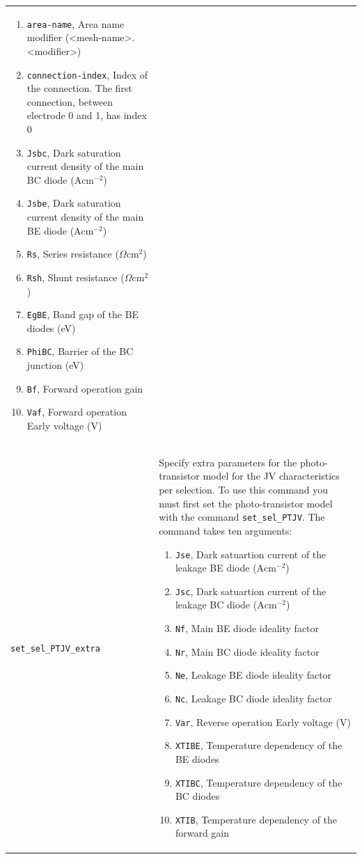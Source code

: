 \documentclass[noshowpacs,preprintnumbers,amsmath,amssymb, letter]{revtex4}
\begin{document}
\begin{longtable}{p{}p{}}
\begin{enumerate}
\item \texttt{area-name},  Area name modifier (\textless mesh-name\textgreater .\textless modifier\textgreater )
\item \texttt{connection-index}, Index of the connection. The first connection, between electrode 0 and 1,  has index 0
\item \texttt{Jsbc},  Dark saturation current density of the main BC diode ($\text{A}\text{cm}^{-2}$)
\item \texttt{Jsbe},  Dark saturation current density of the main BE diode  ($\text{A}\text{cm}^{-2}$)
\item \texttt{Rs}, Series resistance ($\Omega \text{cm}^2$)
\item \texttt{Rsh}, Shunt resistance ($\Omega \text{cm}^2$)
\item \texttt{EgBE},  Band gap of the BE diodes (eV)
\item \texttt{PhiBC},  Barrier of the BC junction (eV)
\item \texttt{Bf},  Forward operation gain 
\item \texttt{Vaf},  Forward operation Early voltage (V)
\end{enumerate}\\
\texttt{set\_sel\_PTJV\_extra}	&  Specify extra parameters for the photo-transistor model for the JV characteristics per selection. To use this command you must first set the photo-transistor model with the command \texttt{set\_sel\_PTJV}. The command takes ten arguments:
\begin{enumerate}
\item \texttt{Jse},  Dark satuartion current of the leakage BE diode ($\text{A}\text{cm}^{-2}$)
\item \texttt{Jsc},  Dark satuartion current of the leakage BC diode ($\text{A}\text{cm}^{-2}$)
\item \texttt{Nf},  Main BE diode ideality factor 
\item \texttt{Nr},  Main BC diode ideality factor 
\item \texttt{Ne},  Leakage BE diode ideality factor 
\item \texttt{Nc},  Leakage BC diode ideality factor
\item \texttt{Var},  Reverse operation Early voltage (V)
\item \texttt{XTIBE},  Temperature dependency of the BE diodes 
\item \texttt{XTIBC},  Temperature dependency of the BC diodes 
\item \texttt{XTIB},  Temperature dependency of the forward gain 

\end{enumerate}
\end{longtable}
\end{document}
